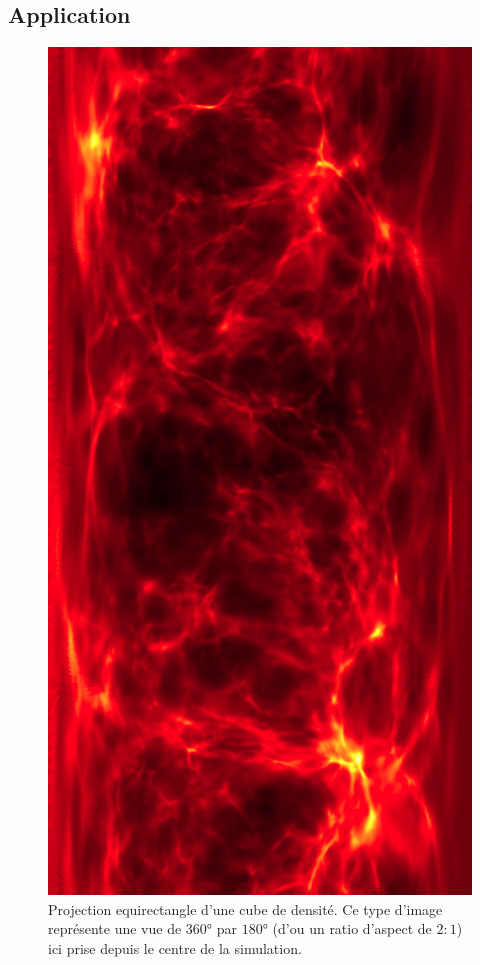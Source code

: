 \subsection{Application}


\begin{figure}
        \includegraphics[height=.95\textheight]{img/04/equi.png} 
        \caption[Projection equirectangle]{Projection equirectangle d'une cube de densité.
        Ce type d'image représente une vue de $360°$ par $180°$ (d'ou un ratio d'aspect de $2:1$) ici prise depuis le centre de la simulation.}
 		\label{fig:equirectangle}
\end{figure}

